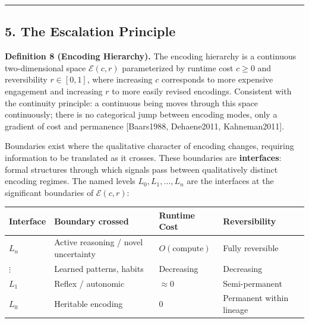 \documentclass[
]{article}
\newcounter{none} %
\begin{document}
\begin{center}\rule{0.5\linewidth}{0.5pt}\end{center}

\subsection{5. The Escalation Principle}\label{the-escalation-principle}

\textbf{Definition 8 (Encoding Hierarchy).} The encoding hierarchy is a
continuous two-dimensional space \(\mathcal{E}(c, r)\) parameterized by
runtime cost \(c \geq 0\) and reversibility \(r \in [0, 1]\), where
increasing \(c\) corresponds to more expensive engagement and increasing
\(r\) to more easily revised encodings. Consistent with the continuity
principle: a continuous being moves through this space continuously;
there is no categorical jump between encoding modes, only a gradient of
cost and permanence {[}Baars1988, Dehaene2011, Kahneman2011{]}.

Boundaries exist where the qualitative character of encoding changes,
requiring information to be translated as it crosses. These boundaries
are \textbf{interfaces}: formal structures through which signals pass
between qualitatively distinct encoding regimes. The named levels
\(L_0, L_1, \ldots, L_n\) are the interfaces at the significant
boundaries of \(\mathcal{E}(c, r)\):

{\def\LTcaptype{none} %
\begin{longtable}[]{@{}
  >{\raggedright\arraybackslash}p{}
  >{\raggedright\arraybackslash}p{}
  >{\raggedright\arraybackslash}p{}
  >{\raggedright\arraybackslash}p{}@{}}
\toprule\noalign{}
\begin{minipage}[b]{\linewidth}\raggedright
Interface
\end{minipage} & \begin{minipage}[b]{\linewidth}\raggedright
Boundary crossed
\end{minipage} & \begin{minipage}[b]{\linewidth}\raggedright
Runtime Cost
\end{minipage} & \begin{minipage}[b]{\linewidth}\raggedright
Reversibility
\end{minipage} \\
\midrule\noalign{}
\endhead
\bottomrule\noalign{}
\endlastfoot
\(L_n\) & Active reasoning / novel uncertainty & \(O(\text{compute})\) &
Fully reversible \\
\(\vdots\) & Learned patterns, habits & Decreasing & Decreasing \\
\(L_1\) & Reflex / autonomic & \(\approx 0\) & Semi-permanent \\
\(L_0\) & Heritable encoding & \(0\) & Permanent within lineage \\
\end{longtable}
}
\end{document}
